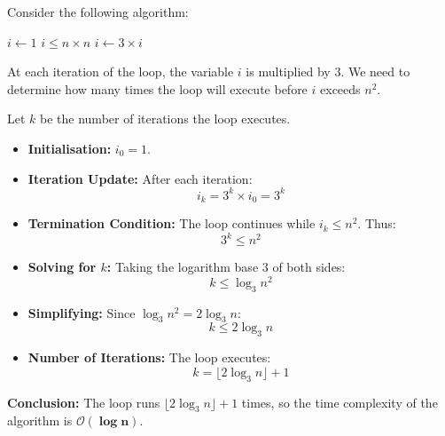 \begin{example}

    Consider the following algorithm:
    
    \begin{codebox}
        \li $i \gets 1$
        \li \While $i \leq n \times n$ \Do
        \li     $i \gets 3 \times i$
            \End
    \end{codebox}
    
    At each iteration of the \texttt{\While} loop, the variable $i$ is multiplied by $3$. We need to determine how many times the loop will execute before $i$ exceeds $n^2$.
    
    Let $k$ be the number of iterations the loop executes.
    
    \begin{itemize}
        \item \textbf{Initialisation:} $i_0 = 1$.
        \item \textbf{Iteration Update:} After each iteration:
        \[ i_k = 3^k \times i_0 = 3^k \]
        \item \textbf{Termination Condition:} The loop continues while $i_k \leq n^2$. Thus:
        \[ 3^k \leq n^2 \]
        \item \textbf{Solving for $k$:} Taking the logarithm base $3$ of both sides:
        \[ k \leq \log_3 n^2 \]
        \item \textbf{Simplifying:} Since $\log_3 n^2 = 2 \log_3 n$:
        \[ k \leq 2 \log_3 n \]
        \item \textbf{Number of Iterations:} The loop executes:
        \[ k = \lfloor 2 \log_3 n \rfloor + 1 \]
    \end{itemize}
    
    \textbf{Conclusion:} The loop runs $\lfloor 2 \log_3 n \rfloor + 1$ times, so the time complexity of the algorithm is $\boldsymbol{\mathcal{O}(\log n)}$.
    
\end{example}

